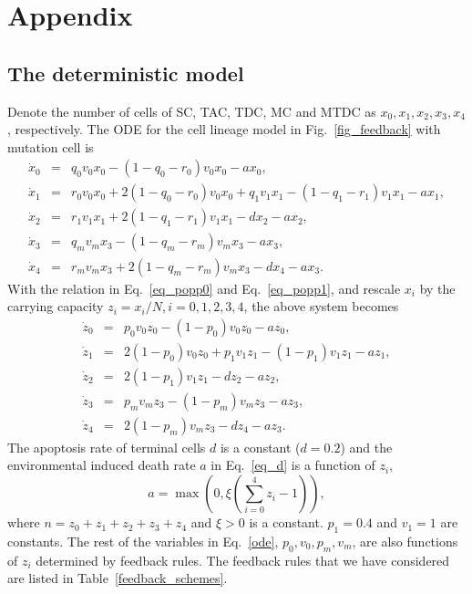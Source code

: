 \documentclass[12pt]{article}
\begin{document}
\section*{Appendix}

\subsection*{The deterministic model}
Denote the number of cells of SC, TAC, TDC, MC and MTDC as
$x_0, x_1, x_2, x_3, x_4$, respectively. 
The ODE for the cell lineage model in Fig.~\ref{fig_feedback} 
with mutation cell is
\begin{eqnarray*}
\dot{x}_0 &=& q_0 v_0 x_0 - (1-q_0-r_0)v_0x_0 - a x_0, \nonumber \\
\dot{x}_1 &=& r_0 v_0 x_0 + 2 (1-q_0-r_0) v_0 x_0 + 
q_1 v_1 x_1 - (1-q_1-r_1) v_1 x_1 - a x_1, \nonumber \\
\dot{x}_2 &=& r_1 v_1 x_1 + 2 (1-q_1-r_1) v_1 x_1 - d x_2 - a x_2, \nonumber \\
\dot{x}_3 &=& q_m v_m x_3 - (1-q_m-r_m) v_m x_3 - a x_3, \nonumber \\
\dot{x}_4 &=& r_m v_m x_3 + 2 (1-q_m-r_m) v_m x_3 - d x_4 - a x_3.
\end{eqnarray*}
With the relation in Eq.~\eqref{eq_popp0} and Eq.~\eqref{eq_popp1},
and rescale $x_i$ by the carrying capacity $z_i = x_i/N, i=0,1,2,3,4$, 
the above system becomes
\begin{eqnarray}
\dot{z}_0 &=& p_0 v_0 z_0 - (1-p_0)v_0 z_0 - a z_0, \nonumber \\
\dot{z}_1 &=& 2 (1-p_0) v_0 z_0 + 
p_1 v_1 z_1 - (1-p_1) v_1 z_1 - a z_1, \nonumber \\
\dot{z}_2 &=& 2 (1-p_1) v_1 z_1 - d z_2 - a z_2, \nonumber \\
\dot{z}_3 &=& p_m v_m z_3 - (1-p_m) v_m z_3 - a z_3, \nonumber \\
\dot{z}_4 &=& 2 (1-p_m) v_m z_3 - d z_4 - a z_3.
\label{ode}
\end{eqnarray}
The apoptosis rate of terminal cells $d$ is a constant ($d=0.2$)
and the environmental induced death rate $a$ 
in Eq.~\eqref{eq_d} is a function of $z_i$,
$$
a = \max \left(0, \xi \left( \sum_{i=0}^{4}z_i - 1 \right) \right),
$$
where $n=z_0 + z_1 + z_2 + z_3 + z_4$ and $\xi>0$ is a constant.
$p_1 = 0.4$ and $v_1 = 1$ are constants. 
The rest of the variables in Eq.~\eqref{ode}, 
$p_0, v_0, p_m, v_m$, are also functions of $z_i$
determined by feedback rules.
The feedback rules that we have considered 
are listed in Table~\ref{feedback_schemes}.
\end{document}
